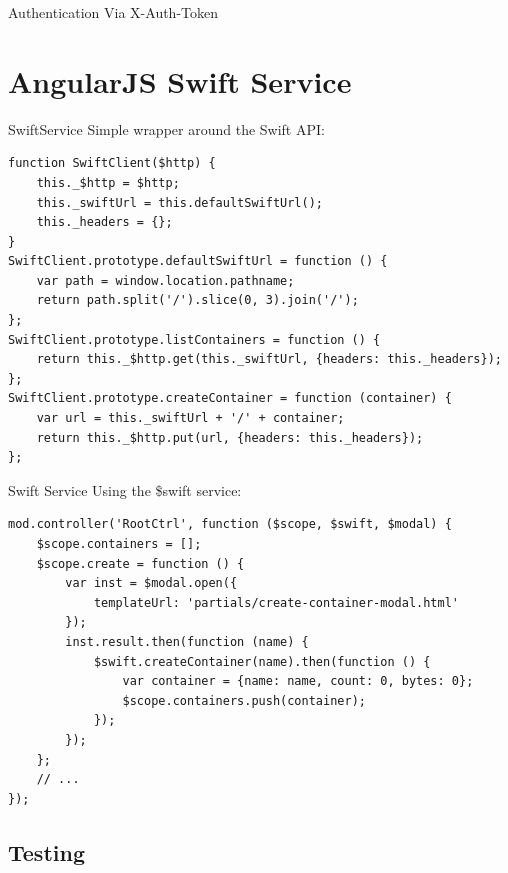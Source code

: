 \documentclass[t,noamsthm]{beamer}
\newcommand{\code}[1]{#1}
\begin{document}
\begin{frame}{Authentication}
  Via X-Auth-Token
\end{frame}

\section{AngularJS Swift Service}

\begin{frame}[fragile]{SwiftService}
  Simple wrapper around the Swift API:
\begin{lstlisting}
function SwiftClient($http) {
    this._$http = $http;
    this._swiftUrl = this.defaultSwiftUrl();
    this._headers = {};
}
SwiftClient.prototype.defaultSwiftUrl = function () {
    var path = window.location.pathname;
    return path.split('/').slice(0, 3).join('/');
};
SwiftClient.prototype.listContainers = function () {
    return this._$http.get(this._swiftUrl, {headers: this._headers});
};
SwiftClient.prototype.createContainer = function (container) {
    var url = this._swiftUrl + '/' + container;
    return this._$http.put(url, {headers: this._headers});
};
\end{lstlisting}
\end{frame}

\begin{frame}[fragile]{Swift Service}
Using the \code{\$swift} service:
\begin{lstlisting}
mod.controller('RootCtrl', function ($scope, $swift, $modal) {
    $scope.containers = [];
    $scope.create = function () {
        var inst = $modal.open({
            templateUrl: 'partials/create-container-modal.html'
        });
        inst.result.then(function (name) {
            $swift.createContainer(name).then(function () {
                var container = {name: name, count: 0, bytes: 0};
                $scope.containers.push(container);
            });
        });
    };
    // ...
});
\end{lstlisting}
\end{frame}

\subsection{Testing}
\end{document}
